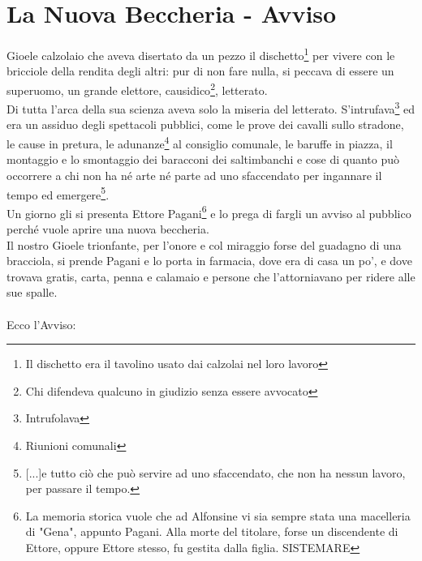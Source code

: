 
\chapter{La Nuova Beccheria - Avviso}
Gioele calzolaio che aveva disertato da un pezzo il dischetto\footnote{Il dischetto era il tavolino usato dai calzolai nel loro lavoro} per vivere con le bricciole della rendita degli altri: pur di non fare nulla, si peccava di essere un superuomo, un grande elettore, causidico\footnote{Chi difendeva qualcuno in giudizio senza essere avvocato}, letterato.\\
Di tutta l'arca della sua scienza aveva solo la miseria del letterato. S'intrufava\footnote{Intrufolava} ed era un assiduo degli spettacoli pubblici, come le prove dei cavalli sullo stradone, le cause in pretura, le adunanze\footnote{Riunioni comunali} al consiglio comunale, le baruffe in piazza, il montaggio e lo smontaggio dei baracconi dei saltimbanchi e cose di quanto può occorrere a chi non ha né arte né parte ad uno sfaccendato per ingannare il tempo ed emergere\footnote{[...]e tutto ciò che può servire ad uno sfaccendato, che non ha nessun lavoro, per passare il tempo.}.\\
Un giorno gli si presenta Ettore Pagani\footnote{La memoria storica vuole che ad Alfonsine vi sia sempre stata una macelleria di "Gena", appunto Pagani. Alla morte del titolare, forse un discendente di Ettore, oppure Ettore stesso, fu gestita dalla figlia. SISTEMARE} e lo prega di fargli un avviso al pubblico perché vuole aprire una nuova beccheria. \\
Il nostro Gioele trionfante, per l'onore e col miraggio forse del guadagno di una bracciola, si prende Pagani e lo porta in farmacia, dove era di casa un po', e dove trovava gratis, carta, penna e calamaio e persone che l'attorniavano per ridere alle sue spalle.\\
\\
Ecco l'Avviso:

 \normalsize \normalfont 

